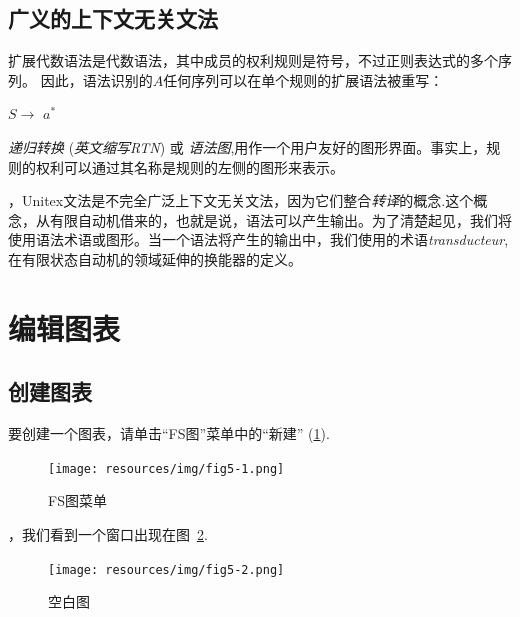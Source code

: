 \subsection{广义的上下文无关文法}

   扩展代数语法是代数语法，其中成员的权利规则是符号，不过正则表达式的多个序列。  因此，语法识别的$ A $任何序列可以在单个规则的扩展语法被重写：


\bigskip $S \rightarrow$ $a^{*}$

\bigskip
{}\textit{递归转换} (\textit{英文缩写RTN}) 或 \textit{语法图},用作一个用户友好的图形界面。事实上，规则的权利可以通过其名称是规则的左侧的图形来表示。


\bigskip
{}，Unitex文法是不完全广泛上下文无关文法，因为它们整合\textit{转译}的概念.这个概念，从有限自动机借来的，也就是说，语法可以产生输出。为了清楚起见，我们将使用语法术语或图形。当一个语法将产生的输出中，我们使用的术语\textit{transducteur},
在有限状态自动机的领域延伸的换能器的定义。


\section{编辑图表}
\label{section-editing-graphs}

\subsection{创建图表}
要创建一个图表，请单击“FS图”菜单中的“新建” (\ref{fig-fsgraph-menu}).

\begin{figure}[!h]
\begin{center}
\texttt{[image: resources/img/fig5-1.png]}
\caption{FS图菜单\label{fig-fsgraph-menu}}
\end{center}
\end{figure}

\bigskip
{}，我们看到一个窗口出现在图~\ref{fig-new-graph}.

\begin{figure}[!h]
\begin{center}
\texttt{[image: resources/img/fig5-2.png]}
\caption{空白图\label{fig-new-graph}}
\end{center}
\end{figure}

